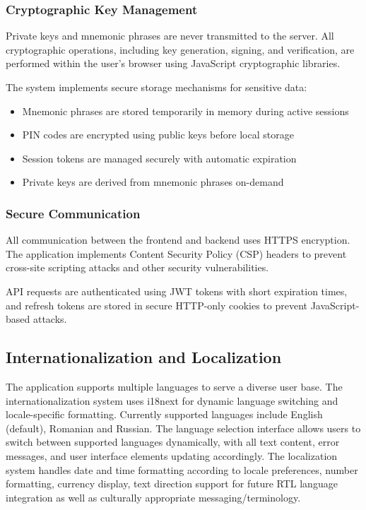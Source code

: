 \subsubsection{Cryptographic Key Management}
Private keys and mnemonic phrases are never transmitted to the server. All cryptographic operations, including key generation, signing, and verification, are performed within the user's browser using JavaScript cryptographic libraries.

The system implements secure storage mechanisms for sensitive data:
\begin{itemize}
    \item Mnemonic phrases are stored temporarily in memory during active sessions
    \item PIN codes are encrypted using public keys before local storage
    \item Session tokens are managed securely with automatic expiration
    \item Private keys are derived from mnemonic phrases on-demand
\end{itemize}

\subsubsection{Secure Communication}
All communication between the frontend and backend uses HTTPS encryption. The application implements Content Security Policy (CSP) headers to prevent cross-site scripting attacks and other security vulnerabilities.

API requests are authenticated using JWT tokens with short expiration times, and refresh tokens are stored in secure HTTP-only cookies to prevent JavaScript-based attacks.

\subsection{Internationalization and Localization}
The application supports multiple languages to serve a diverse user base. The internationalization system uses i18next for dynamic language switching and locale-specific formatting. Currently supported languages include English (default), Romanian and Russian. The language selection interface allows users to switch between supported languages dynamically, with all text content, error messages, and user interface elements updating accordingly. The localization system handles date and time formatting according to locale preferences, number formatting, currency display, text direction support for future RTL language integration as well as culturally appropriate messaging/terminology.

